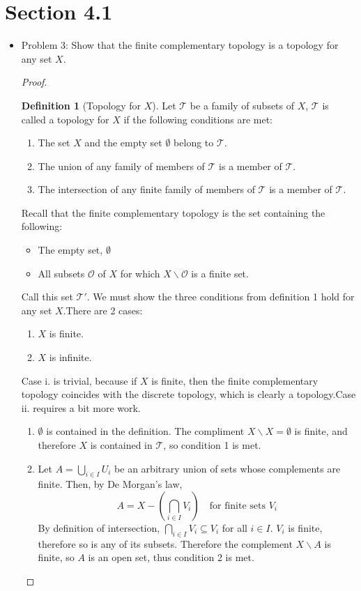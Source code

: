 \documentclass[hidelinks,12pt]{article}
\theoremstyle{definition}
\newtheorem{definition}{Definition}
\newcommand{\T}{\mathcal T}
\renewcommand{\O}{\mathcal{O}}
\begin{document}
\section{Section 4.1}
\begin{itemize}
    \item Problem 3: Show that the finite complementary topology is a topology for any set $X$.\begin{proof}\begin{definition}[Topology for $X$] Let $\T$ be a family of subsets of $X$, $\T$ is called a topology for $X$ if the following conditions are met:\begin{enumerate}
        \item The set $X$ and the empty set $\emptyset$ belong to $\T$.
        \item The union of any family of members of $\T$ is a member of $\T$.
        \item The intersection of any finite family of members of $\T$ is a member of $\T$.
    \end{enumerate}\end{definition}
    Recall that the finite complementary topology is the set containing the following:\begin{itemize}
        \item The empty set, $\emptyset$
        \item All subsets $\O$ of $X$ for which $X\backslash\O$ is a finite set.
    \end{itemize}
    Call this set $\T'$. We must show the three conditions from definition 1 hold for any set $X$.\newline There are 2 cases:\begin{enumerate}[label=\roman*.]
        \item $X$ is finite.
        \item $X$ is infinite.
    \end{enumerate}
    Case i. is trivial, because if $X$ is finite, then the finite complementary topology coincides with the discrete topology, which is clearly a topology.\newline Case ii. requires a bit more work.\begin{enumerate}
        \item $\emptyset$ is contained in the definition. The compliment $X\backslash X=\emptyset$ is finite, and therefore $X$ is contained in $\T$, so condition 1 is met.
        \item Let $A=\bigcup_{i\in I}U_i$ be an arbitrary union of sets whose complements are finite. Then, by De Morgan's law, $$A=X-(\bigcap_{i\in I}V_i)\quad\text{for finite sets }V_i$$ By definition of intersection, $\bigcap_{i\in I}V_i\subseteq V_i$ for all $i\in I$. $V_i$ is finite, therefore so is any of its subsets. Therefore the complement $X\backslash A$ is finite, so $A$ is an open set, thus condition 2 is met.

\end{enumerate}
\end{proof}
\end{itemize}
\end{document}
